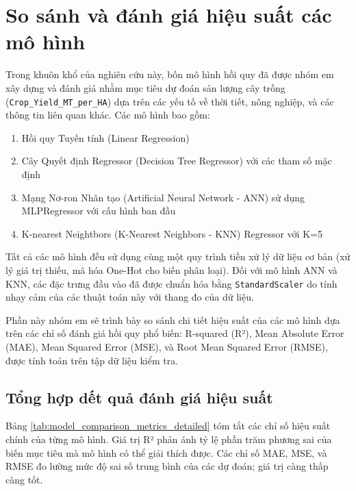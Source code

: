 \section{So sánh và đánh giá hiệu suất các mô hình}
\label{sec:model_comparison_detailed}

Trong khuôn khổ của nghiên cứu này, bốn mô hình hồi quy đã được nhóm em xây dựng và đánh giá nhằm mục tiêu dự đoán sản lượng cây trồng (\texttt{Crop\_Yield\_MT\_per\_HA}) dựa trên các yếu tố về thời tiết, nông nghiệp, và các thông tin liên quan khác. Các mô hình bao gồm:
\begin{enumerate}
    \item Hồi quy Tuyến tính (Linear Regression)
    \item Cây Quyết định Regressor (Decision Tree Regressor) với các tham số mặc định
    \item Mạng Nơ-ron Nhân tạo (Artificial Neural Network - ANN) sử dụng MLPRegressor với cấu hình ban đầu
    \item K-nearest Neightbors (K-Nearest Neighbors - KNN) Regressor với K=5
\end{enumerate}
Tất cả các mô hình đều sử dụng cùng một quy trình tiền xử lý dữ liệu cơ bản (xử lý giá trị thiếu, mã hóa One-Hot cho biến phân loại). Đối với mô hình ANN và KNN, các đặc trưng đầu vào đã được chuẩn hóa bằng \texttt{StandardScaler} do tính nhạy cảm của các thuật toán này với thang đo của dữ liệu.

Phần này nhóm em sẽ trình bày so sánh chi tiết hiệu suất của các mô hình dựa trên các chỉ số đánh giá hồi quy phổ biến: R-squared (R²), Mean Absolute Error (MAE), Mean Squared Error (MSE), và Root Mean Squared Error (RMSE), được tính toán trên tập dữ liệu kiểm tra.

\subsection{Tổng hợp dết quả đánh giá hiệu suất}
\label{subsec:summary_evaluation_metrics_detailed}

Bảng \ref{tab:model_comparison_metrics_detailed} tóm tắt các chỉ số hiệu suất chính của từng mô hình. Giá trị R² phản ánh tỷ lệ phần trăm phương sai của biến mục tiêu mà mô hình có thể giải thích được. Các chỉ số MAE, MSE, và RMSE đo lường mức độ sai số trung bình của các dự đoán; giá trị càng thấp càng tốt.

